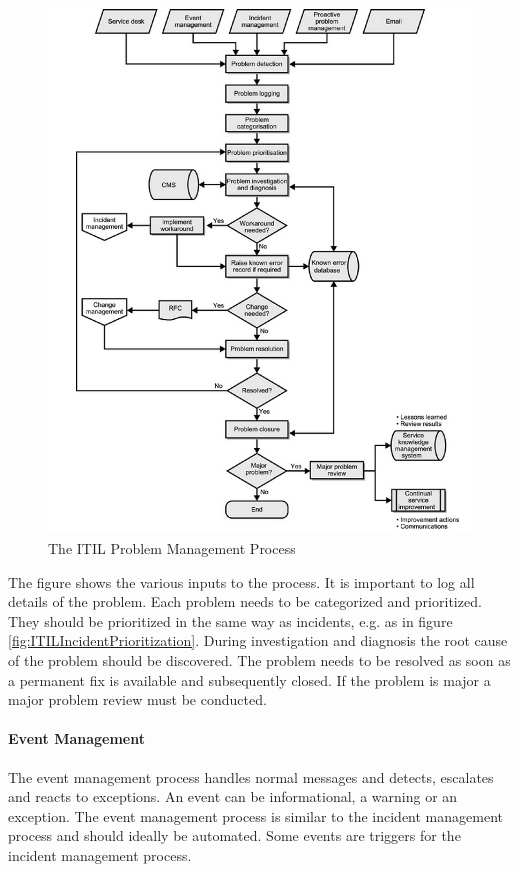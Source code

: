 \begin{figure}[H]
\hspace{-1.2cm}\includegraphics[scale=0.72]{ITILProblemManagement.png}
\caption[The ITIL Problem Management Process]{The ITIL Problem Management Process \cite{itilbok}}
\label{fig:ITILProblemManagement}
\end{figure}

The figure shows the various inputs to the process. It is important to log all details of the problem. Each problem needs to be categorized and prioritized. They should be prioritized in the same way as incidents, e.g. as in figure \ref{fig:ITILIncidentPrioritization}. During investigation and diagnosis the root cause of the problem should be discovered. The problem needs to be resolved as soon as a permanent fix is available and subsequently closed. If the problem is major a major problem review must be conducted.

\paragraph{Event Management}
The event management process handles normal messages and detects, escalates and reacts to exceptions. An event can be informational, a warning or an exception. The event management process is similar to the incident management process and should ideally be automated. Some events are triggers for the incident management process.
